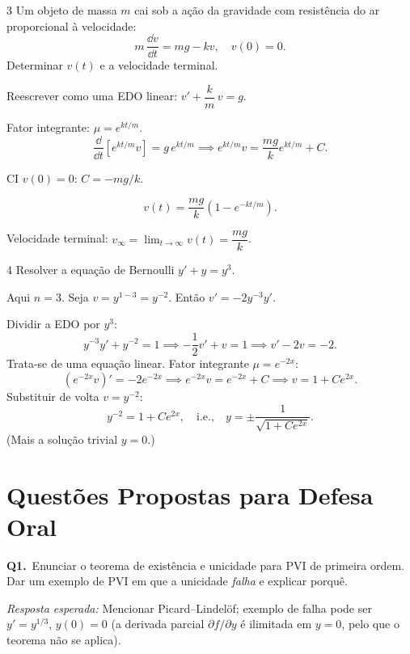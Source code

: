 \begin{exercisebox}{3}
  Um objeto de massa $m$ cai sob a ação da gravidade com resistência do ar proporcional à
  velocidade:
  \[
    m\,\frac{\dd v}{\dd t} = mg - kv, \quad v(0)=0.
  \]
  Determinar $v(t)$ e a velocidade terminal.
\end{exercisebox}

\begin{solbox}
  Reescrever como uma EDO linear: $v' + \dfrac{k}{m}\,v = g$.

  Fator integrante: $\mu = e^{kt/m}$.
  \[
    \frac{\dd}{\dd t}\!\left[e^{kt/m}v\right] = g\,e^{kt/m}
    \implies e^{kt/m}v = \frac{mg}{k}e^{kt/m} + C.
  \]

  CI $v(0)=0$: $C = -mg/k$.

  \[
    \boxed{v(t) = \frac{mg}{k}\!\left(1-e^{-kt/m}\right).}
  \]

  Velocidade terminal: $v_{\infty} = \lim_{t\to\infty} v(t) = \dfrac{mg}{k}$.
\end{solbox}

\begin{exercisebox}{4}
  Resolver a equação de Bernoulli $y' + y = y^3$.
\end{exercisebox}

\begin{solbox}
  Aqui $n=3$. Seja $v = y^{1-3} = y^{-2}$. Então $v' = -2y^{-3}y'$.

  Dividir a EDO por $y^3$:
  \[
    y^{-3}y' + y^{-2} = 1
    \implies -\frac{1}{2}v' + v = 1
    \implies v' - 2v = -2.
  \]
  Trata-se de uma equação linear. Fator integrante $\mu = e^{-2x}$:
  \[
    \left(e^{-2x}v\right)' = -2e^{-2x}
    \implies e^{-2x}v = e^{-2x} + C
    \implies v = 1 + Ce^{2x}.
  \]
  Substituir de volta $v=y^{-2}$:
  \[
    \boxed{y^{-2} = 1 + Ce^{2x}, \quad \text{i.e.,}\quad
           y = \pm\frac{1}{\sqrt{1+Ce^{2x}}}.}
  \]
  (Mais a solução trivial $y=0$.)
\end{solbox}

\section{Questões Propostas para Defesa Oral}
\label{sec:oral5}

\begin{oralbox}
  \textbf{Q1.}\ Enunciar o teorema de existência e unicidade para PVI de primeira ordem.
  Dar um exemplo de PVI em que a unicidade \emph{falha} e explicar porquê.

  \medskip
  \textit{Resposta esperada:} Mencionar Picard--Lindel\"of; exemplo de falha pode ser
  $y' = y^{1/3}$, $y(0)=0$ (a derivada parcial $\partial f/\partial y$ é ilimitada
  em $y=0$, pelo que o teorema não se aplica).
\end{oralbox}

